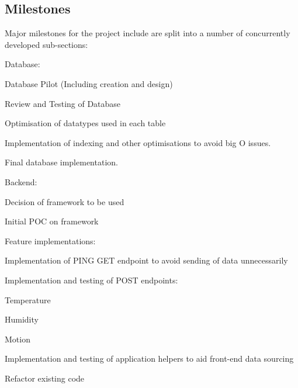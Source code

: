 \documentclass{article}
\begin{document}
        \subsection{Milestones}
            Major milestones for the project include are split into a number of 
            concurrently developed sub-sections:
            \\
            \begin{legal}
                \item Database:
                \begin{legal}
                    \item Database Pilot (Including creation and design)
                    \item Review and Testing of Database
                    \item Optimisation of datatypes used in each table
                    \item Implementation of indexing and other optimisations to avoid big O issues.
                    \item Final database implementation.
                \end{legal}
                \item Backend:
                \begin{legal}
                    \item Decision of framework to be used
                    \item Initial POC on framework
                    \item Feature implementations: 
                    \begin{legal}
                        \item Implementation of PING GET endpoint to avoid sending of data unnecessarily
                        \item Implementation and testing of POST endpoints:
                        \begin{legal}
                            \item Temperature
                            \item Humidity
                            \item Motion
                        \end{legal}
                        \item Implementation and testing of application helpers to aid front-end data sourcing
                    \end{legal}
                    \item Refactor existing code

\end{legal}
\end{legal}
\end{document}
